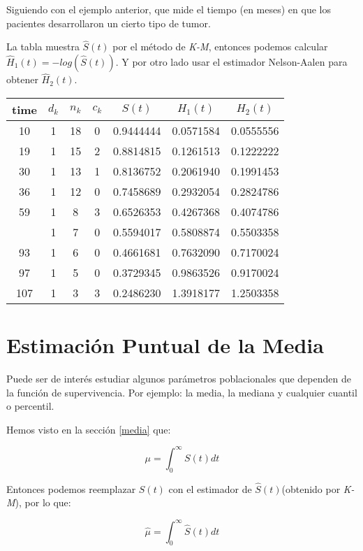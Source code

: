 \documentclass[
  a4paper,
  oneside,
  openany]{book}
\begin{document}
Siguiendo con el ejemplo anterior, que mide el tiempo (en meses) en que los pacientes desarrollaron un cierto tipo de tumor.

La tabla muestra \(\hat S(t)\) por el método de \emph{K-M}, entonces podemos calcular \(\hat {H}_1(t)=-log(\hat S(t))\). Y por otro lado usar el estimador Nelson-Aalen para obtener \(\hat{H}_2(t)\).

\begin{table}
\centering
\begin{tabular}{ccccccc}
\toprule
time & $d_k$ & $n_k$ & $c_k$ & $S(t)$ & $H_1(t)$ & $H_2(t)$\\
\midrule
10 & 1 & 18 & 0 & 0.9444444 & 0.0571584 & 0.0555556\\
19 & 1 & 15 & 2 & 0.8814815 & 0.1261513 & 0.1222222\\
30 & 1 & 13 & 1 & 0.8136752 & 0.2061940 & 0.1991453\\
36 & 1 & 12 & 0 & 0.7458689 & 0.2932054 & 0.2824786\\
59 & 1 & 8 & 3 & 0.6526353 & 0.4267368 & 0.4074786\\
\addlinespace
75 & 1 & 7 & 0 & 0.5594017 & 0.5808874 & 0.5503358\\
93 & 1 & 6 & 0 & 0.4661681 & 0.7632090 & 0.7170024\\
97 & 1 & 5 & 0 & 0.3729345 & 0.9863526 & 0.9170024\\
107 & 1 & 3 & 3 & 0.2486230 & 1.3918177 & 1.2503358\\
\bottomrule
\end{tabular}
\end{table}

\hypertarget{estimaciuxf3n-puntual-de-la-media}{%
\section{Estimación Puntual de la Media}\label{estimaciuxf3n-puntual-de-la-media}}

Puede ser de interés estudiar algunos parámetros poblacionales que dependen de la función de supervivencia. Por ejemplo: la media, la mediana y cualquier cuantil o percentil.

Hemos visto en la sección \ref{media} que:

\[
\mu = \int_{0}^{\infty}S(t)dt
\]

Entonces podemos reemplazar \(S(t)\) con el estimador de \(\hat{S}(t)\)(obtenido por \emph{K-M}), por lo que:

\[
\hat{\mu}=\int_{0}^{\infty}\hat{S}(t)dt
\]
\end{document}
